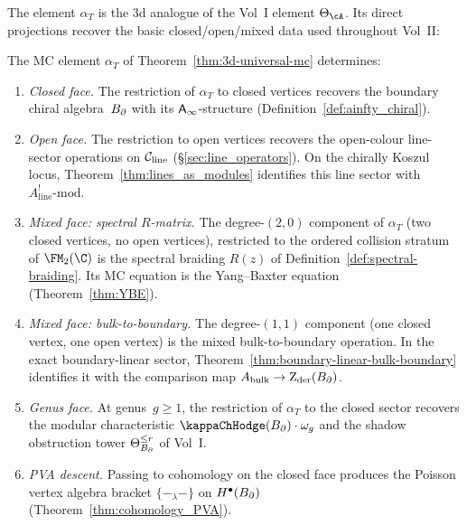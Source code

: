 The element $\alpha_T$ is the 3d analogue of the Vol~I element
$\Theta_\cA$. Its direct projections recover the basic
closed/open/mixed data used throughout Vol~II:

\begin{proposition}
The MC element $\alpha_T$ of
Theorem~\textup{\ref{thm:3d-universal-mc}} determines:
\begin{enumerate}[label=\textup{(\roman*)}]
\item \emph{Closed face.} The restriction of $\alpha_T$ to
 closed vertices recovers the boundary chiral algebra~$B_{\partial}$
 with its $\mathsf{A}_{\infty}$-structure
 \textup{(}Definition~\textup{\ref{def:ainfty_chiral}}\textup{)}.
\item \emph{Open face.} The restriction to open vertices
 recovers the open-colour line-sector operations on
 $\mathcal C_{\mathrm{line}}$
 \textup{(}\S\textup{\ref{sec:line_operators}}\textup{)}. On the
 chirally Koszul locus, Theorem~\textup{\ref{thm:lines_as_modules}}
 identifies this line sector with
 $A^!_{\mathrm{line}}\text{-mod}$.
\item \emph{Mixed face: spectral $R$-matrix.} The degree-$(2,0)$
 component of $\alpha_T$ (two closed vertices, no open
 vertices), restricted to the ordered collision stratum of
 $\FM_2(\C)$ is the spectral braiding $R(z)$ of
 Definition~\textup{\ref{def:spectral-braiding}}. Its MC
 equation is the Yang--Baxter equation
 \textup{(}Theorem~\textup{\ref{thm:YBE}}\textup{)}.
\item \emph{Mixed face: bulk-to-boundary.} The degree-$(1,1)$
 component (one closed vertex, one open vertex) is the
 mixed bulk-to-boundary operation. In the exact boundary-linear
 sector, Theorem~\textup{\ref{thm:boundary-linear-bulk-boundary}}
 identifies it with the comparison map
 $A_{\mathrm{bulk}} \to \operatorname{Z}_{\mathrm{der}}(B_{\partial})$.
\item \emph{Genus face.} At genus~$g \ge 1$, the restriction
 of $\alpha_T$ to the closed sector recovers the modular
 characteristic $\kappaChHodge(\Bbound) \cdot \omega_g$ and the
 shadow obstruction tower $\Theta_{B_{\partial}}^{\le r}$ of Vol~I.
\item \emph{PVA descent.} Passing to cohomology on the closed
 face produces the Poisson vertex algebra bracket
 $\{-_\lambda-\}$ on $H^\bullet(B_{\partial})$
 \textup{(}Theorem~\textup{\ref{thm:cohomology_PVA}}\textup{)}.
\end{enumerate}
\end{proposition}

